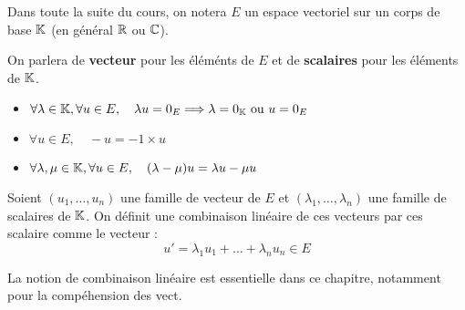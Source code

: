 Dans toute la suite du cours, on notera $E$ un espace vectoriel sur un corps de base $\mathbb{K}$ (en général $\mathbb{R}$ ou $\mathbb{C}$). 

\begin{remark}
    On parlera de \textbf{vecteur} pour les éléménts de $E$ et de \textbf{scalaires} pour les éléments de $\mathbb{K}$. 
\end{remark}

\begin{prop}[Élémentaires]
    \begin{itemize}
        \item $ \forall \lambda \in \mathbb{K}, \forall u \in E, \quad \lambda u = 0_E \Longrightarrow \lambda = 0_{\mathbb{K}} \text{ ou } u = 0_E $ 
        \item $ \forall u \in E, \quad -u = -1 \times u $ 
        \item $ \forall \lambda, \mu \in \mathbb{K}, \forall u \in E, \quad (\lambda - \mu) u = \lambda u - \mu u $  
    \end{itemize}
\end{prop}

\begin{definition}
    Soient $(u_1, \dots, u_n)$ une famille de vecteur de $E$ et $ (\lambda_1, \dots, \lambda_n)$ une famille de scalaires de $\mathbb{K}$. 
    On définit une combinaison linéaire de ces vecteurs par ces scalaire comme le vecteur : 
        \[ u' = \lambda_1 u_1 + \dots + \lambda_n u_n \in E \] 
\end{definition}

La notion de combinaison linéaire est essentielle dans ce chapitre, notamment pour la compéhension des vect. 

